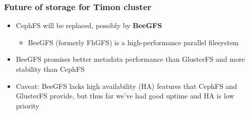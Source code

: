 \documentclass[handout]{beamer}
\begin{document}
\begin{frame}
\frametitle{Future of storage for Timon cluster}
\begin{itemize}
\item CephFS will be replaced, possibly by \textbf{BeeGFS}
\begin{itemize}
\item BeeGFS (formerly FhGFS) is a high-performance parallel filesystem
\end{itemize}
\item BeeGFS promises better metadata performance than GlusterFS and more stability than CephFS
\item Caveat: BeeGFS lacks high availability (HA) features that CephFS and GlusterFS provide, but thus far we've had good uptime and HA is low priority
\end{itemize}
\end{frame}
\end{document}
